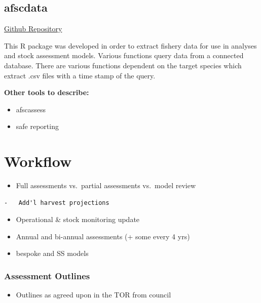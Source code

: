 \documentclass[
  letterpaper,
  oneside,
  open=any]{scrbook}
\providecommand{\tightlist}{%
  \setlength{\itemsep}{0pt}\setlength{\parskip}{0pt}}\usepackage{longtable,booktabs,array}
\begin{document}
\subsection{afscdata}\label{afscdata}

\href{https://github.com/afsc-assessments/afscdata/}{Github Repository}

This R package was developed in order to extract fishery data for use in
analyses and stock assessment models. Various functions query data from
a connected database. There are various functions dependent on the
target species which extract .csv files with a time stamp of the query.

\textbf{Other tools to describe:}

\begin{itemize}
\item
  afscassess
\item
  safe reporting
\end{itemize}

\section{Workflow}\label{workflow}

\begin{itemize}
\tightlist
\item
  Full assessments vs.~partial assessments vs.~model review
\end{itemize}

\begin{verbatim}
-   Add'l harvest projections
\end{verbatim}

\begin{itemize}
\item
  Operational \& stock monitoring update
\item
  Annual and bi-annual assessments (+ some every 4 yrs)
\item
  bespoke and SS models
\end{itemize}

\subsubsection{Assessment Outlines}\label{assessment-outlines}

\begin{itemize}
\tightlist
\item
  Outlines as agreed upon in the TOR from council
\end{itemize}
\end{document}

